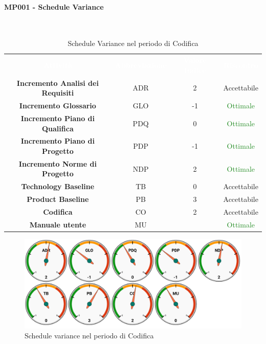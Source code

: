 \paragraph{MP001 - Schedule Variance}\mbox{}\\[0,3cm]

    \begin{table}[H]
        \centering
        \begin{tabular}{cccc}
            \rowcolor{greySWEight}
            \textcolor{white}{\textbf{Attività}} & 
            \textcolor{white}{\textbf{Abbreviazione}} &
            \textcolor{white}{\textbf{Valore Indice}}&
            \textcolor{white}{\textbf{Riscontro}}\\
            \textbf{Incremento Analisi dei Requisiti} & ADR & 2 & \textcolor{YellowOrange}{Accettabile}\\
            \textbf{Incremento Glossario} & GLO & -1 & \textcolor{ForestGreen}{Ottimale} \\
            \textbf{Incremento Piano di Qualifica} & PDQ & 0 & \textcolor{ForestGreen}{Ottimale} \\
            \textbf{Incremento Piano di Progetto} & PDP & -1 & \textcolor{ForestGreen}{Ottimale} \\
            \textbf{Incremento Norme di Progetto} & NDP & 2 & \textcolor{ForestGreen}{Ottimale} \\
            \textbf{Technology Baseline} & TB & 0 & \textcolor{YellowOrange}{Accettabile} \\
            \textbf{Product Baseline} & PB & 3 & \textcolor{YellowOrange}{Accettabile} \\
            \textbf{Codifica} & CO & 2 & \textcolor{YellowOrange}{Accettabile} \\
            \textbf{Manuale utente} & MU &  & \textcolor{ForestGreen}{Ottimale} \\

        \end{tabular}
        \caption{Schedule Variance nel periodo di Codifica}
    \end{table}
    \begin{figure}[H]
        \centering
        \includegraphics[width=0.9\linewidth]{sez/App_Esito/Qualifica/graph/SV_RQ.pdf}
        \caption{Schedule variance nel periodo di Codifica}
    \end{figure}
